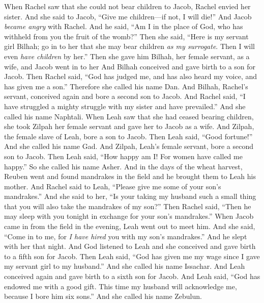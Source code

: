 \begin{biblechapter} %
 When Rachel saw that she could not bear children to Jacob, Rachel envied her sister. And she said to Jacob, “Give me children—if not, I will die!”
\verse And Jacob \textit{became angry} with Rachel. And he said, “Am I in the place of God, who has withheld from you the fruit of the womb?”
\verse Then she said, “Here is my servant girl Bilhah; go in to her that she may bear children \textit{as my surrogate}. Then I will even \textit{have children} by her.”
\verse Then she gave him Bilhah, her female servant, as a wife, and Jacob went in to her
\verse And Bilhah conceived and gave birth to a son for Jacob.
\verse Then Rachel said, “God has judged me, and has also heard my voice, and has given me a son.” Therefore she called his name Dan.
\verse And Bilhah, Rachel’s servant, conceived again and bore a second son to Jacob.
\verse And Rachel said, “I have struggled a mighty struggle with my sister and have prevailed.” And she called his name Naphtali.
\verse When Leah saw that she had ceased bearing children, she took Zilpah her female servant and gave her to Jacob as a wife.
\verse And Zilpah, the female slave of Leah, bore a son to Jacob.
\verse Then Leah said, “Good fortune!” And she called his name Gad.
\verse And Zilpah, Leah’s female servant, bore a second son to Jacob.
\verse Then Leah said, “How happy am I! For women have called me happy.” So she called his name Asher.
\verse And in the days of the wheat harvest, Reuben went and found mandrakes in the field and he brought them to Leah his mother. And Rachel said to Leah, “Please give me some of your son’s mandrakes.”
\verse And she said to her, “Is your taking my husband such a small thing that you will also take the mandrakes of my son?” Then Rachel said, “Then he may sleep with you tonight in exchange for your son’s mandrakes.”
\verse When Jacob came in from the field in the evening, Leah went out to meet him. And she said, “Come in to me, for \textit{I have hired} you with my son’s mandrakes.” And he slept with her that night.
\verse And God listened to Leah and she conceived and gave birth to a fifth son for Jacob.
\verse Then Leah said, “God has given me my wage since I gave my servant girl to my husband.” And she called his name Issachar.
\verse And Leah conceived again and gave birth to a sixth son for Jacob.
\verse And Leah said, “God has endowed me with a good gift. This time my husband will acknowledge me, because I bore him six sons.” And she called his name Zebulun.

\end{biblechapter}
